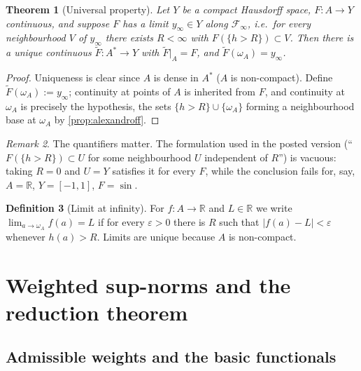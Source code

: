 \documentclass[11pt,a4paper]{article}
\numberwithin{equation}{section}
\theoremstyle{plain}
\newtheorem{theorem}{Theorem}[section]
\theoremstyle{definition}
\newtheorem{definition}[theorem]{Definition}
\theoremstyle{remark}
\newtheorem{remark}[theorem]{Remark}
\newcommand{\R}{\mathbb{R}}
\newcommand{\wA}{\omega_A}
\newcommand{\Astar}{A^{\ast}}
\begin{document}
\begin{theorem}[Universal property]\label{thm:universal}
Let $Y$ be a compact Hausdorff space, $F:A\to Y$ continuous, and suppose $F$ has a limit
$y_\infty\in Y$ along $\mathcal{F}_\infty$, i.e.\ for every neighbourhood $V$ of $y_\infty$
there exists $R<\infty$ with $F(\{h>R\})\subset V$. Then there is a unique continuous
$\widetilde F:\Astar\to Y$ with $\widetilde F|_A=F$, and $\widetilde F(\wA)=y_\infty$.
\end{theorem}

\begin{proof}
Uniqueness is clear since $A$ is dense in $\Astar$ ($A$ is non-compact). Define
$\widetilde F(\wA):=y_\infty$; continuity at points of $A$ is inherited from $F$, and
continuity at $\wA$ is precisely the hypothesis, the sets $\{h>R\}\cup\{\wA\}$ forming a
neighbourhood base at $\wA$ by \cref{prop:alexandroff}.
\end{proof}

\begin{remark}
The quantifiers matter. The formulation used in the posted version (``$F(\{h>R\})\subset U$
for some neighbourhood $U$ independent of $R$'') is vacuous: taking $R=0$ and $U=Y$
satisfies it for every $F$, while the conclusion fails for, say, $A=\R$, $Y=[-1,1]$,
$F=\sin$.
\end{remark}

\begin{definition}[Limit at infinity]\label{def:limit}
For $f:A\to\R$ and $L\in\R$ we write $\lim_{a\to\wA}f(a)=L$ if for every $\varepsilon>0$
there is $R$ such that $|f(a)-L|<\varepsilon$ whenever $h(a)>R$. Limits are unique because
$A$ is non-compact.
\end{definition}

\section{Weighted sup-norms and the reduction theorem}
\label{sec:norms}

\subsection{Admissible weights and the basic functionals}
\end{document}

